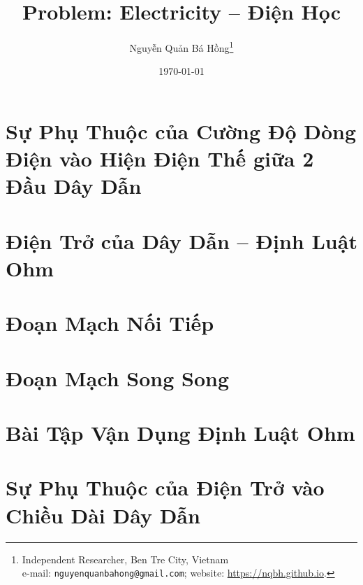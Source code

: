 \documentclass{article}
\title{Problem: Electricity -- Điện Học}
\author{Nguyễn Quản Bá Hồng\footnote{Independent Researcher, Ben Tre City, Vietnam\\e-mail: \texttt{nguyenquanbahong@gmail.com}; website: \url{https://nqbh.github.io}.}}
\date{\today}
\begin{document}
\maketitle
\begin{abstract}
	
\end{abstract}
\tableofcontents
\newpage


\section{Sự Phụ Thuộc của Cường Độ Dòng Điện vào Hiện Điện Thế giữa 2 Đầu Dây Dẫn}


\section{Điện Trở của Dây Dẫn -- Định Luật Ohm}


\section{Đoạn Mạch Nối Tiếp}


\section{Đoạn Mạch Song Song}


\section{Bài Tập Vận Dụng Định Luật Ohm}


\section{Sự Phụ Thuộc của Điện Trở vào Chiều Dài Dây Dẫn}
\end{document}

